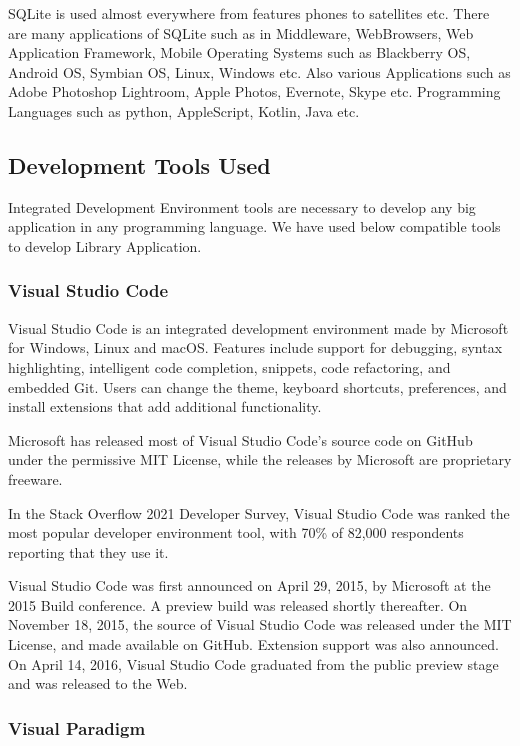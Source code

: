 \documentclass[12pt, a4paper]{report}
\begin{document}
\par SQLite is used almost everywhere from features phones to satellites etc. There are many applications of SQLite such as in Middleware, WebBrowsers, Web Application Framework, Mobile Operating Systems such as Blackberry OS, Android OS, Symbian OS, Linux, Windows etc. Also various Applications such as Adobe Photoshop Lightroom, Apple Photos, Evernote, Skype etc. Programming Languages such as python, AppleScript, Kotlin, Java etc.

\newpage
\subsection{Development Tools Used}

Integrated Development Environment tools are necessary to develop any big application in any programming language. We have used below compatible tools to develop Library Application. 
\subsubsection{Visual Studio Code}
Visual Studio Code is an integrated development environment made by Microsoft for Windows, Linux and macOS. Features include support for debugging, syntax highlighting, intelligent code completion, snippets, code refactoring, and embedded Git. Users can change the theme, keyboard shortcuts, preferences, and install extensions that add additional functionality.

Microsoft has released most of Visual Studio Code's source code on GitHub under the permissive MIT License, while the releases by Microsoft are proprietary freeware.

In the Stack Overflow 2021 Developer Survey, Visual Studio Code was ranked the most popular developer environment tool, with 70\% of 82,000 respondents reporting that they use it.

Visual Studio Code was first announced on April 29, 2015, by Microsoft at the 2015 Build conference. A preview build was released shortly thereafter. On November 18, 2015, the source of Visual Studio Code was released under the MIT License, and made available on GitHub. Extension support was also announced. On April 14, 2016, Visual Studio Code graduated from the public preview stage and was released to the Web.
\subsubsection{Visual Paradigm}
\end{document}
